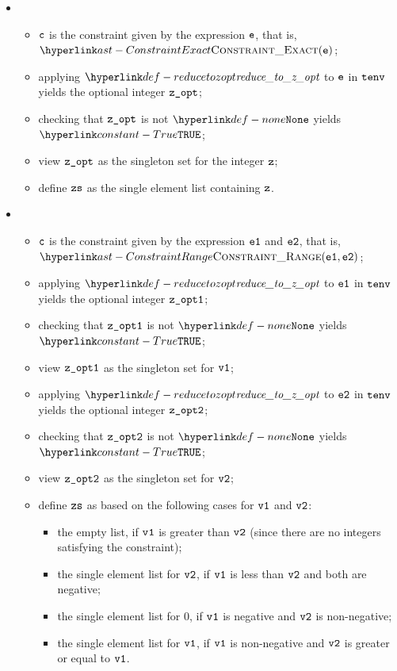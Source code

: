 \ProseParagraph
\OneApplies
\begin{itemize}
    \item {}
    \begin{itemize}
        \item $\texttt{c}$ is the constraint given by the expression $\texttt{e}$, that is, $\ConstraintExact(\ve)$;
        \item applying $\reducetozopt$ to $\texttt{e}$ in $\texttt{tenv}$ yields the optional integer $\texttt{z\_opt}$;
        \item checking that $\texttt{z\_opt}$ is not $\None$ yields $\True$\ProseTerminateAs{\NoBaseValue};
        \item view $\texttt{z\_opt}$ as the singleton set for the integer $\texttt{z}$;
        \item define $\texttt{zs}$ as the single element list containing $\texttt{z}$.
    \end{itemize}

    \item {}
    \begin{itemize}
        \item $\texttt{c}$ is the constraint given by the expression $\texttt{e1}$ and $\texttt{e2}$, that is, \\
                $\ConstraintRange(\veone, \vetwo)$;
        \item applying $\reducetozopt$ to $\texttt{e1}$ in $\texttt{tenv}$ yields the optional integer $\texttt{z\_opt1}$;
        \item checking that $\texttt{z\_opt1}$ is not $\None$ yields $\True$\ProseTerminateAs{\NoBaseValue};
        \item view $\texttt{z\_opt1}$ as the singleton set for $\texttt{v1}$;
        \item applying $\reducetozopt$ to $\texttt{e2}$ in $\texttt{tenv}$ yields the optional integer $\texttt{z\_opt2}$;
        \item checking that $\texttt{z\_opt2}$ is not $\None$ yields $\True$\ProseTerminateAs{\NoBaseValue};
        \item view $\texttt{z\_opt2}$ as the singleton set for $\texttt{v2}$;
        \item define $\texttt{zs}$ as based on the following cases for $\texttt{v1}$ and $\texttt{v2}$:
        \begin{itemize}
            \item the empty list, if $\texttt{v1}$ is greater than $\texttt{v2}$ (since there are no integers satisfying the constraint);
            \item the single element list for $\texttt{v2}$, if $\texttt{v1}$ is less than $\texttt{v2}$ and both are negative;
            \item the single element list for $0$, if $\texttt{v1}$ is negative and $\texttt{v2}$ is non-negative;
            \item the single element list for $\texttt{v1}$, if $\texttt{v1}$ is non-negative and $\texttt{v2}$ is greater or equal to $\texttt{v1}$.
        \end{itemize}
    \end{itemize}
\end{itemize}

